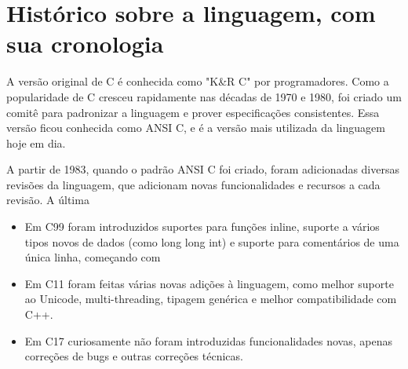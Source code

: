 \chapter{Histórico sobre a linguagem, com sua cronologia}

A versão original de C é conhecida como "K\&R C" por programadores.
Como a popularidade de C cresceu rapidamente nas décadas de 1970 e 1980,
foi criado um comitê para padronizar a linguagem e prover especificações 
consistentes. Essa versão ficou conhecida como ANSI C,
e é a versão mais utilizada da linguagem hoje em dia.

A partir de 1983, quando o padrão ANSI C foi criado, foram adicionadas 
diversas revisões da linguagem, que adicionam novas funcionalidades e recursos a cada revisão. A última 

\begin{itemize}
    \item Em C99 
    foram introduzidos suportes para funções inline, suporte a vários tipos novos de dados (como long long int)
    e suporte para comentários de uma única linha, começando com

    \item Em C11 foram feitas várias novas adições à linguagem, como melhor suporte ao Unicode, 
    multi-threading, tipagem genérica e melhor compatibilidade com C++.

    \item Em C17 curiosamente não foram introduzidas funcionalidades novas, apenas correções de bugs e outras correções técnicas.



\end{itemize}

\newpage